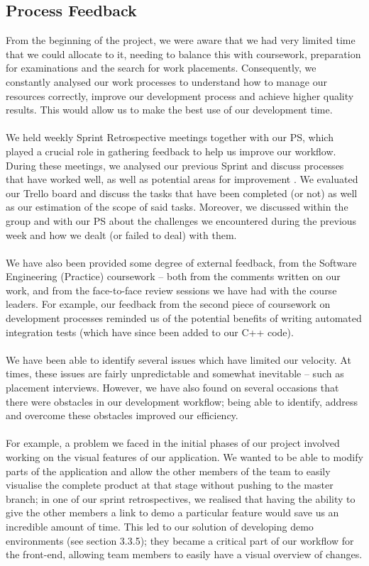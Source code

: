\documentclass[a4paper, 10pt]{report}
\begin{document}
\subsection{Process Feedback}
From the beginning of the project, we were aware that we had very limited time that we could allocate to it, needing to balance this with coursework, preparation for examinations and the search for work placements. Consequently, we constantly analysed our work processes to understand how to manage our resources correctly, improve our development process and achieve higher quality results. This would allow us to make the best use of our development time. \\\\
We held weekly Sprint Retrospective meetings together with our PS, which played a crucial role in gathering feedback to help us improve our workflow. During these meetings, we analysed our previous Sprint and discuss processes that have worked well, as well as potential areas for improvement \cite{sprint-retro}. We evaluated our Trello board and discuss the tasks that have been completed (or not) as well as our estimation of the scope of said tasks. Moreover, we discussed within the group and with our PS about the challenges we encountered during the previous week and how we dealt (or failed to deal) with them. \\\\
We have also been provided some degree of external feedback, from the Software Engineering (Practice) coursework -- both from the comments written on our work, and from the face-to-face review sessions we have had with the course leaders. For example, our feedback from the second piece of coursework on development processes reminded us of the potential benefits of writing automated integration tests (which have since been added to our C++ code).\\\\
We have been able to identify several issues which have limited our velocity. At times, these issues are fairly unpredictable and somewhat inevitable -- such as placement interviews. However, we have also found on several occasions that there were obstacles in our development workflow; being able to identify, address and overcome these obstacles improved our efficiency.\\\\
For example, a problem we faced in the initial phases of our project involved working on the visual features of our application. We wanted to be able to modify parts of the application and allow the other members of the team to easily visualise the complete product at that stage without pushing to the master branch; in one of our sprint retrospectives, we realised that having the ability to give the other members a link to demo a particular feature would save us an incredible amount of time. This led to our solution of developing demo environments (see section 3.3.5); they became a critical part of our workflow for the front-end, allowing team members to easily have a visual overview of changes.
\end{document}
